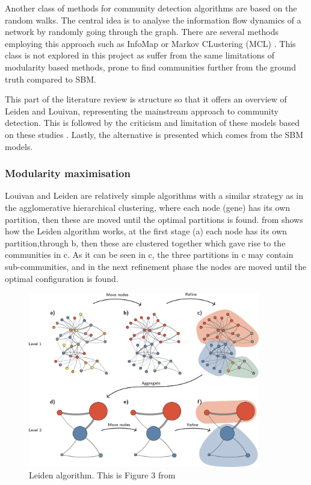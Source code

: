 Another class of methods for community detection algorithms are based on the random walks. The central idea is to analyse the information flow dynamics of a network by randomly going through the graph. There are several methods employing this approach such as InfoMap  \citet{Rosvall2008-kw} or Markov CLustering (MCL) \citet{Van_Dongen2008-yj}. This class is not explored in this project as suffer from the same limitations of modularity based methods\cite{Peixoto2021-jx}, prone to find communities further from the ground truth compared to SBM.

This part of the literature review is structure so that it offers an overview of Leiden and Louivan, representing the mainstream approach to community detection. This is followed by the criticism and limitation of these models based on these studies \cite{Peixoto2021-jx, Peixoto2023-rt, Shemirani2023-ww}. Lastly, the alternative is presented which comes from the SBM models.


\subsubsection{Modularity maximisation} \label{s:lit:mod_max}

Louivan \citet{Blondel2008-ik} and Leiden \citet{Traag2019-ne} are relatively simple algorithms with a similar strategy as in the agglomerative hierarchical clustering, where each node (gene) has its own partition, then these are moved until the optimal partitions is found.  from \cite{Traag2019-ne} shows how the Leiden algorithm works, at the first stage (a) each node has its own partition,through b, then these are clustered together which gave rise to the communities in c. As it can be seen in c, the three partitions in c may contain sub-communities, and in the next refinement phase the nodes are moved until the optimal configuration is found.

\begin{figure}[!htb]    
    \centering
\includegraphics[width=0.9\textwidth,height=0.9\textheight,keepaspectratio]{Sections/Lit_review/Resources/Leiden_algorithm.png}
    \caption{Leiden algorithm. This is Figure 3 from \citet{Traag2019-ne}}
    \label{fig:N_I:leiden-explained}
\end{figure}



